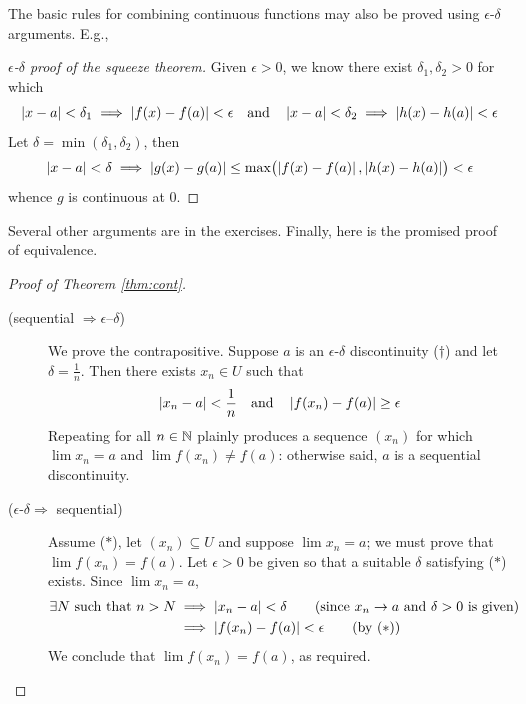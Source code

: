 \footnotetext{%
	Remember the hidden quantifier: $\nm{x-a}<\delta$ \emph{for all} $x\in\dom f=[0,\infty)$, thus $x\ge 0$ for the duration of this example.%
}

The basic rules for combining continuous functions may also be proved using $\epsilon$-$\delta$ arguments. E.g.,

\begin{proof}[$\epsilon$-$\delta$ proof of the squeeze theorem]
	Given $\epsilon>0$, we know there exist $\delta_1,\delta_2>0$ for which
	\[
		\left| x-a\right|<\delta_1\implies \left| f(x)-f(a)\right|<\epsilon
		\quad\text{and}\quad
		\left| x-a\right|<\delta_2\implies \left| h(x)-h(a)\right|<\epsilon
	\]
	Let $\delta=\min(\delta_1,\delta_2)$, then
  \[
  	\left| x-a\right|<\delta
  	\implies\left| g(x)-g(a)\right|
  	\le\max\bigl(\left| f(x)-f(a)\right|,\left| h(x)-h(a)\right|\bigr) 
  	<\epsilon
  \]
	whence $g$ is continuous at 0.
\end{proof}

Several other arguments are in the exercises. Finally, here is the promised proof of equivalence.


\goodbreak


\begin{proof}[Proof of Theorem \ref{thm:cont}]
	\begin{description}
		\item[\normalfont(sequential $\Rightarrow\epsilon$--$\delta$)] We prove the contrapositive. Suppose $a$ is an $\epsilon$-$\delta$ discontinuity ($\dag$) and let $\delta=\frac 1n$. Then there exists $x_n\in U$ such that
		\[
			\left| x_n-a\right|<\frac 1n
			\quad\text{and}\quad 
			\left| f(x_n)-f(a)\right|\ge\epsilon
		\]
		Repeating for all $n\in\mathbb{N}$ plainly produces a sequence $(x_n)$ for which $\lim x_n=a$ and $\lim f(x_n)\neq f(a)$: otherwise said, $a$ is a sequential discontinuity.
		
		\item[\normalfont($\epsilon$-$\delta\Rightarrow$ sequential)] Assume ($\ast$), let $(x_n)\subseteq U$ and suppose $\lim x_n=a$; we must prove that $\lim f(x_n)=f(a)$. Let $\epsilon>0$ be given so that a suitable $\delta$ satisfying ($\ast$) exists. Since $\lim x_n=a$,
		\begin{align*}
			\exists N\text{ such that }n>N
			&\implies \left| x_n-a\right|<\delta \tag{since $x_n\to a$ and $\delta>0$ is given}\\
			&\implies\left| f(x_n)-f(a)\right|<\epsilon \tag{by ($\ast$)}
		\end{align*}
		We conclude that $\lim f(x_n)=f(a)$, as required.\qedhere
	\end{description}
\end{proof}



